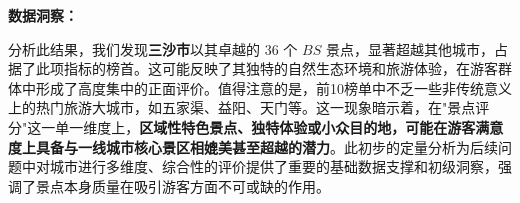 \textbf{数据洞察：}

分析此结果，我们发现\textbf{三沙市}以其卓越的 $\text{36}$ 个 $BS$ 景点，显著超越其他城市，占据了此项指标的榜首。这可能反映了其独特的自然生态环境和旅游体验，在游客群体中形成了高度集中的正面评价。值得注意的是，前10榜单中不乏一些非传统意义上的热门旅游大城市，如五家渠、益阳、天门等。这一现象暗示着，在"景点评分"这一单一维度上，\textbf{区域性特色景点、独特体验或小众目的地，可能在游客满意度上具备与一线城市核心景区相媲美甚至超越的潜力}。此初步的定量分析为后续问题中对城市进行多维度、综合性的评价提供了重要的基础数据支撑和初级洞察，强调了景点本身质量在吸引游客方面不可或缺的作用。